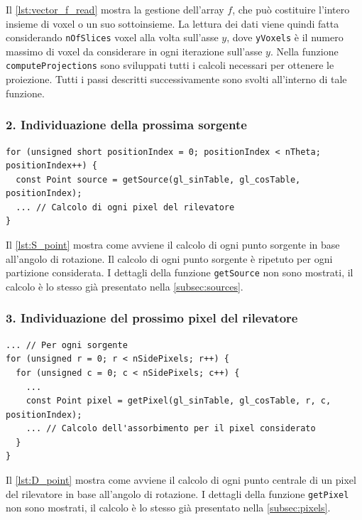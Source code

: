\documentclass[12pt,a4paper]{report}
\begin{document}
Il \autoref{lst:vector_f_read} mostra la gestione dell'array \(f\), che può costituire l'intero insieme di voxel o un suo
sottoinsieme.
La lettura dei dati viene quindi fatta considerando \lstinline{nOfSlices} voxel alla volta sull'asse \(y\), dove
\lstinline{yVoxels} è il numero massimo di voxel da considerare in ogni iterazione sull'asse \(y\).
Nella funzione \lstinline{computeProjections} sono sviluppati tutti i calcoli necessari per ottenere le proiezione.
Tutti i passi descritti successivamente sono svolti all'interno di tale funzione.

\subsubsection{2. Individuazione della prossima sorgente}

\begin{lstlisting}[language=CStyle, caption={Codice C per l'individuazione di un punto sorgente.}, label={lst:S_point}]
for (unsigned short positionIndex = 0; positionIndex < nTheta; positionIndex++) {
  const Point source = getSource(gl_sinTable, gl_cosTable, positionIndex);
  ... // Calcolo di ogni pixel del rilevatore
}
\end{lstlisting}

Il \autoref{lst:S_point} mostra come avviene il calcolo di ogni punto sorgente in base all'angolo di rotazione.
Il calcolo di ogni punto sorgente è ripetuto per ogni partizione considerata.
I dettagli della funzione \lstinline{getSource} non sono mostrati, il calcolo è lo stesso già presentato nella
\autoref{subsec:sources}.

\subsubsection{3. Individuazione del prossimo pixel del rilevatore}

\begin{lstlisting}[language=CStyle, caption={Codice C per l'individuazione di un pixel del rilevatore.}, label={lst:D_point}]
... // Per ogni sorgente
for (unsigned r = 0; r < nSidePixels; r++) {
  for (unsigned c = 0; c < nSidePixels; c++) {
    ...
    const Point pixel = getPixel(gl_sinTable, gl_cosTable, r, c, positionIndex);
    ... // Calcolo dell'assorbimento per il pixel considerato
  }
}
\end{lstlisting}

Il \autoref{lst:D_point} mostra come avviene il calcolo di ogni punto centrale di un pixel del rilevatore in base all'angolo di
rotazione.
I dettagli della funzione \lstinline{getPixel} non sono mostrati, il calcolo è lo stesso già presentato nella
\autoref{subsec:pixels}.
\end{document}
